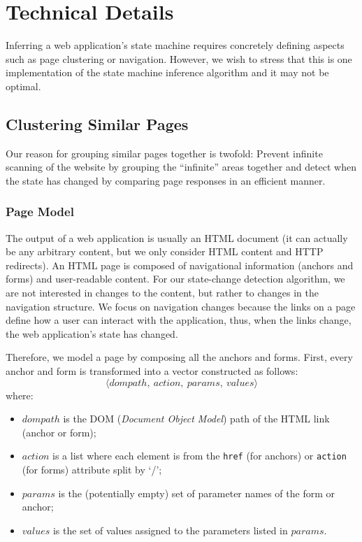 \section{Technical Details}

Inferring a web application's state machine requires concretely defining
aspects such as page clustering or navigation. However, we wish to stress that
this is one implementation of the state machine inference algorithm and it may
not be optimal.

\subsection{Clustering Similar Pages}

Our reason for grouping similar pages together is twofold: Prevent infinite
scanning of the website by grouping the ``infinite'' areas together and detect
when the state has changed by comparing page responses in an efficient manner.

\subsubsection{Page Model}



The output of a web application is usually an HTML document (it can actually be
any arbitrary content, but we only consider HTML content and HTTP redirects).
An HTML page is composed of navigational information (anchors and forms) and
user-readable content. For our state-change detection algorithm, we are not
interested in changes to the content, but rather to changes in the navigation
structure. We focus on navigation changes because the links on a page define
how a user can interact with the application, thus, when the links change, the
web application's state has changed.

Therefore, we model a page by composing all the anchors and forms. First, every
anchor and form is transformed into a vector constructed as follows:
\[
\langle{}dompath,\ action,\ params,\ values\rangle{}
\]
where:
\begin{itemize}
 \item $dompath$ is the DOM (\emph{Document Object Model}) path of the HTML
  link (anchor or form);
 \item $action$ is a list where each element is from the \texttt{href} (for anchors) or
  \texttt{action} (for forms) attribute split by `/';
 \item $params$ is the (potentially empty) set of parameter names of the form
   or anchor;
 \item $values$ is the set of values assigned to the parameters listed in
   $params$.
\end{itemize}

